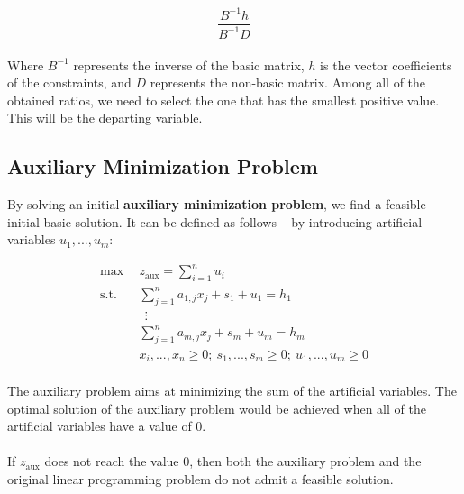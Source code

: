 \documentclass{article}
\begin{document}
\[ \frac{B^{-1}h}{B^{-1}D} \] \\
Where $B^{-1}$ represents the inverse of the basic matrix, $h$ is the vector coefficients of the constraints, and $D$ represents the non-basic matrix. Among all of the obtained ratios, we need to select the one that has the smallest positive value. This will be the departing variable.

\subsection{Auxiliary Minimization Problem}
By solving an initial \textbf{auxiliary minimization problem}, we find a feasible initial basic solution. It can be defined as follows -- by introducing artificial variables $u_1, ..., u_m$:

\begin{align*}
	\max~~ & z_{\text{aux}} = \sum_{i = 1}^n u_i \\
	\text{s.t.}~~ & \sum_{j = 1}^n a_{1,j}x_j+s_1+u_1 = h_1 \\
	~~&~~ \vdots \\
	~~& \sum_{j = 1}^n a_{m,j}x_j+s_m+u_m = h_m \\
	~~& x_i, ..., x_n \geq 0;~ s_1, ..., s_m \geq 0;~ u_1, ..., u_m \geq 0
\end{align*} \\
The auxiliary problem aims at minimizing the sum of the artificial variables. The optimal solution of the auxiliary problem would be achieved when all of the artificial variables have a value of 0. \\ \\
If $z_{\text{aux}}$ does not reach the value 0, then both the auxiliary problem and the original linear programming problem do not admit a feasible solution.
\end{document}
